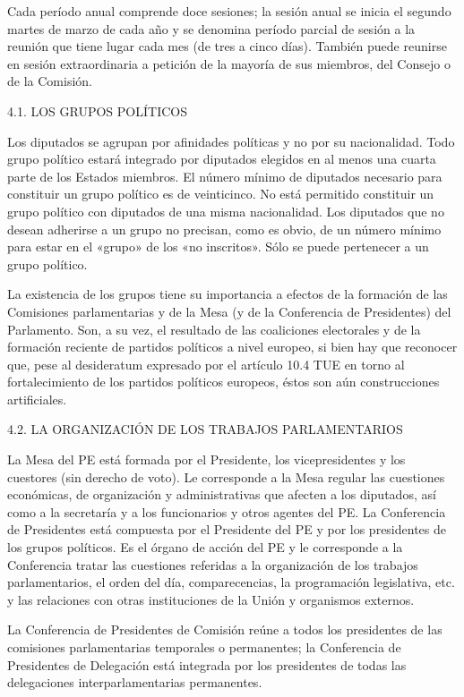 \documentclass[10pt,a4paper]{article}
\begin{document}
Cada período anual comprende doce sesiones; la sesión anual se inicia el segundo martes de marzo de cada año y se denomina período parcial de sesión a la reunión que tiene lugar cada mes (de tres a cinco días). También puede reunirse en sesión extraordinaria a petición de la mayoría de sus miembros, del Consejo o de la Comisión.

4.1. LOS GRUPOS POLÍTICOS

Los diputados se agrupan por afinidades políticas y no por su nacionalidad. Todo grupo político estará integrado por diputados elegidos en al menos una cuarta parte de los Estados miembros. El número mínimo de diputados necesario para constituir un grupo  político es de veinticinco. No está permitido constituir un grupo político con diputados de una misma nacionalidad. Los diputados que no desean adherirse a un grupo no precisan, como es obvio, de un número mínimo para estar en el «grupo» de los «no inscritos». Sólo se puede pertenecer a un grupo político. 

La existencia de los grupos tiene su importancia a efectos de la formación de las Comisiones parlamentarias y de la Mesa (y de la Conferencia de Presidentes) del Parlamento. Son, a su vez, el resultado de las coaliciones electorales y de la formación reciente de partidos políticos a nivel europeo, si bien hay que reconocer que, pese al desideratum expresado por el artículo 10.4 TUE en torno al fortalecimiento de los partidos políticos europeos, éstos son aún construcciones artificiales.

4.2. LA ORGANIZACIÓN DE LOS TRABAJOS PARLAMENTARIOS

La Mesa del PE está formada por el Presidente, los vicepresidentes y los cuestores (sin derecho de voto). Le corresponde a la Mesa regular las cuestiones económicas, de organización y administrativas que afecten a los diputados, así como a la secretaría y a los funcionarios y otros agentes del PE. La Conferencia de Presidentes está compuesta por el Presidente del PE y por los presidentes de los grupos políticos. Es el órgano de acción del PE y le corresponde a la Conferencia tratar las cuestiones referidas a la organización de los trabajos parlamentarios, el orden del día, comparecencias, la programación legislativa, etc. y las relaciones con otras instituciones de la Unión y organismos externos.

La Conferencia de Presidentes de Comisión reúne a todos los presidentes de las comisiones parlamentarias temporales o permanentes; la Conferencia de Presidentes de Delegación está integrada por los presidentes de todas las delegaciones interparlamentarias permanentes.
\end{document}

